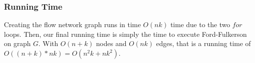 \documentclass[12pt, oneside]{article}
\begin{document}
\subsubsection*{Running Time}
Creating the flow network graph runs in time $O(nk)$ time due to the two $for$ loops. Then, our final running time is simply the time to execute Ford-Fulkerson on graph $G$. With $O(n+k)$ nodes and $O(nk)$ edges, that is a running time of $O((n+k)*nk) = O(n^2k + nk^2)$.
\end{document}
